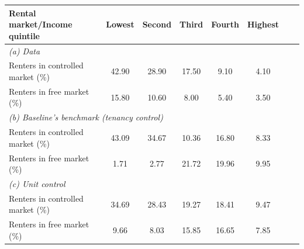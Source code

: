 \begin{table}[p]
\footnotesize
\renewcommand{\arraystretch}{1.2}
\begin{center}
\begin{tabular}{lccccccc}
\toprule
Rental market/Income quintile & Lowest & Second & Third & Fourth & Highest\\ 
\midrule
\multicolumn{6}{l}{\textit{(a) Data}}\\
Renters in controlled market (\%) & 42.90 & 28.90 & 17.50 &	9.10 & 4.10\\
Renters in free market (\%) & 15.80 & 10.60 & 8.00 & 5.40 & 3.50 \\
\multicolumn{6}{l}{\textit{(b) Baseline's benchmark (tenancy control)}}\\
Renters in controlled market (\%) & 43.09 & 34.67 & 10.36 & 16.80 & 8.33 \\
Renters in free market (\%) & 1.71 & 2.77 & 21.72 & 19.96 & 9.95 \\
\multicolumn{6}{l}{\textit{(c) Unit control}}\\
Renters in controlled market (\%) & 34.69 & 28.43 & 19.27 & 18.41 & 9.47 \\
Renters in free market (\%) & 9.66 & 8.03 & 15.85 & 16.65 & 7.85\\
\bottomrule
\end{tabular}
\end{center}
\normalsize
\end{table}
